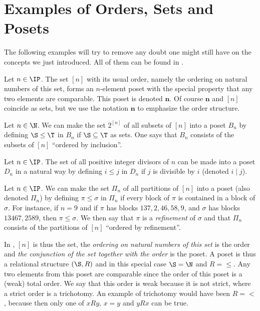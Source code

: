 \section{Examples of Orders, Sets and Posets}


The following examples will try to remove any doubt one might still have on the
concepts we just introduced. All of them can be found in
\citet*{Stanley:2011:ECV:2124415}.




\begin{example}
\label{ex:poset:def}

\item\label{ex:poset:def:a} Let $n \in \IP$. The set $[n]$ with its usual order,
namely the ordering on natural numbers of this set, forms an $n$-element poset
with the special property that any two elements are comparable. This poset is
denoted $\bm{n}$. Of course $\bm{n}$ and $[n]$ coincide as sets, but we use the
notation $\bm{n}$ to emphasize the order structure.

\item\label{ex:poset:def:b} Let $n \in \N$. We can make the set $2^{[n]}$ of
all subsets of $[n]$ into a poset $B_n$ by defining $\S \leq \T$ in $B_n$ if $\S
\subseteq \T$ as sets. One says that $B_n$ consists of the subsets of $[n]$
``ordered by inclusion''.

\item\label{ex:poset:def:c}  Let $n \in \IP$. The set of all positive integer
divisors of $n$ can be made into a poset $D_n$ in a natural way by defining $i
\leq j$ in $D_n$ if $j$ is divisible by $i$ (denoted $i \mid j$).

\item\label{ex:poset:def:d}  Let $n \in \IP$. We can make the set $\Pi_n$ of all
partitions of $[n]$ into a poset (also denoted $\Pi_n$) by defining $\pi \leq
\sigma$ in $\Pi_n$ if every block of $\pi$ is contained in a block of $\sigma$.
For instance, if $n = 9$ and if $\pi$ has blocks $137, 2, 46, 58, 9$, and
$\sigma$ has blocks $13467, 2589$, then $\pi \leq \sigma$. We then say that
$\pi$ is a \emph{refinement} of $\sigma$ and that $\Pi_n$ consists of the
partitions of $[n]$ ``ordered by refinement''.
\end{example}


In , $[n]$ is thus the set, the \emph{ordering on natural
numbers of this set} is the order and \emph{the conjunction of the set together
with the order} is the poset. A poset is thus a relational structure $(\S, R)$
and in this special case $\S = \N$ and $R = \le$. Any two elements from this
poset are comparable since the order of this poset is a (weak) total order. We
say that this order is weak because it is not strict, where a strict order is a
trichotomy. An example of trichotomy would have been $R = <$, because then only
one of $x R y$, $x = y$ and $y R x$ can be true.


